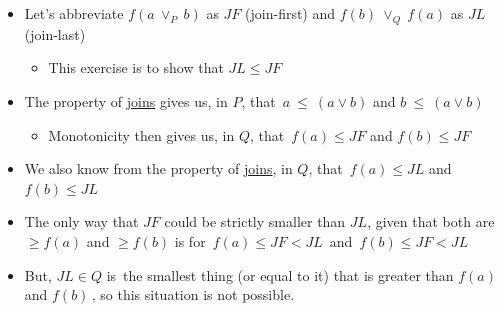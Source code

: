 \begin{itemize}
    \item  Let's abbreviate $f(a\ \lor_P\ b)$ as $JF$ (join-first) and $f(b)\ \lor_Q\  f(a)$ as $JL$ (join-last)
          \begin{itemize}
            \item This exercise is to show that $JL \leq JF$\end{itemize}
    \item The property of \hyperref[D1.81]{joins} gives us, in $P$, that \,$a\ \leq\ (a \lor b)$ and $b\ \leq\ (a \lor b)$\,
          \begin{itemize}
            \item Monotonicity then gives us, in $Q$, that \,$f(a) \leq JF$ and $f(b) \leq JF$\,
          \end{itemize}
    \item We also know from the property of \hyperref[D1.81]{joins}, in $Q$, that \,$f(a) \leq JL$ and $f(b) \leq JL$\,
    \item The only way that $JF$ could be strictly smaller than $JL$, given that both are $\geq f(a)$ and $\geq f(b)$ is for \,$f(a) \leq JF < JL$\, and  \,$f(b) \leq JF < JL$\,
    \item But, $JL \in Q$ is \,the smallest thing (or equal to it) that is greater than $f(a)$ and $f(b)$\,, so this situation is not possible.
  \end{itemize}